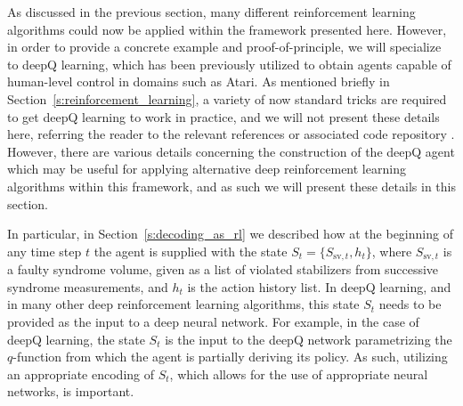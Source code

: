\documentclass[twocolumn,preprintnumbers,amsmath,amssymb,notitlepage,nofootinbib,longbibliography,superscriptaddress,aps,pra,10pt]{revtex4-1}
\begin{document}
	As discussed in the previous section, many different reinforcement learning algorithms could now be applied within the framework presented here.
	However, in order to provide a concrete example and proof-of-principle, we will specialize to deepQ learning, which has been previously utilized to obtain agents capable of human-level control in domains such as Atari.
	As mentioned briefly in Section~\ref{s:reinforcement_learning}, a variety of now standard tricks are required to get deepQ learning to work in practice, and we will not present these details here, referring the reader to the relevant references \cite{RLMnih15,RLvan2016deep,RLschaul2015prioritized,RLwang2015dueling} or associated code repository \cite{DeepQDecoding}.
	However, there are various details concerning the construction of the deepQ agent which may be useful for applying alternative deep reinforcement learning algorithms within this framework, and as such we will present these details in this section.

	In particular, in Section~\ref{s:decoding_as_rl} we described how at the beginning of any time step $t$ the agent is supplied with the state $S_{t}=\{S_{\mathrm{sv},{t}},h_{t}\}$, where $S_{\mathrm{sv},{t}}$ is a faulty syndrome volume, given as a list of violated stabilizers from successive syndrome measurements, and $h_{t}$ is the action history list.
	In deepQ learning, and in many other deep reinforcement learning algorithms, this state $S_t$ needs to be provided as the input to a deep neural network.
	For example, in the case of deepQ learning, the state $S_t$ is the input to the deepQ network parametrizing the $q$-function from which the agent is partially deriving its policy.
	As such, utilizing an appropriate encoding of $S_t$, which allows for the use of appropriate neural networks, is important.
\end{document}
